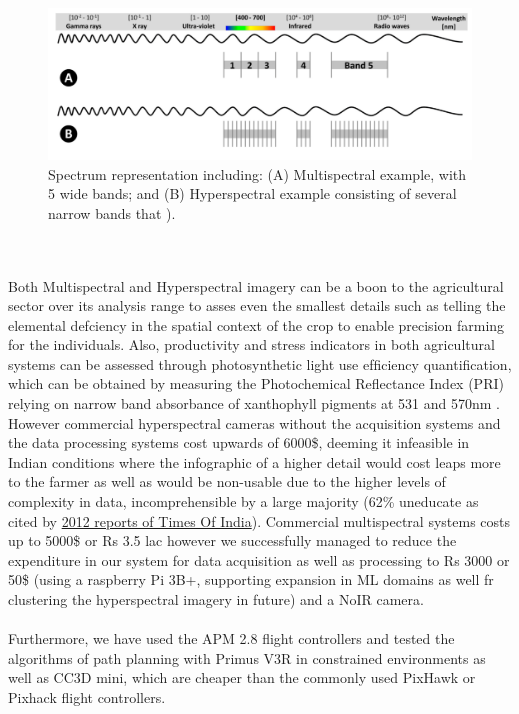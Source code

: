 \begin{figure}[H]
    \centering
    \includegraphics[width=0.7\linewidth]{SummerInterReport/project/Images-Major/em_spectra.png}
    \caption{Spectrum representation including: (A) Multispectral example, with 5 wide bands; and (B) Hyperspectral example consisting of several narrow bands that \cite{fourteen-remotev2}).}
    \label{fig:Concise Flow}
\end{figure}

\\
\\

Both Multispectral and Hyperspectral imagery can be a boon to the agricultural sector over its analysis range to asses even the smallest details such as telling the elemental defciency in the spatial context of the crop to enable precision farming for the individuals. Also, productivity and stress indicators in both agricultural systems can be assessed through photosynthetic light use efﬁciency quantiﬁcation, which can be obtained by measuring the Photochemical Reﬂectance Index (PRI) relying on narrow band absorbance of xanthophyll pigments at 531 and 570nm \cite{fifteen-remotev2}.  However commercial hyperspectral cameras without the acquisition systems and the data processing systems cost upwards of 6000\$, deeming it infeasible in Indian conditions where the infographic of a higher detail would cost leaps more to the farmer as well as would be non-usable due to the higher levels of complexity in data, incomprehensible by a large majority (62\% uneducate as cited by \href{https://timesofindia.indiatimes.com/india/62-farmers-cannot-meet-educational-needs-Survey/articleshow/12049496.cms}{2012 reports of Times Of India}). Commercial multispectral systems costs up to 5000\$ or Rs 3.5 lac however we successfully managed to reduce the expenditure in our system for data acquisition as well as processing to Rs 3000 or 50\$ (using a raspberry Pi 3B+, supporting expansion in ML domains as well fr clustering the hyperspectral imagery in future) and a NoIR camera.
\\
\\
Furthermore, we have used the APM 2.8 flight controllers and tested the algorithms of path planning with Primus V3R in constrained environments as well as CC3D mini, which are cheaper than the commonly used PixHawk or Pixhack flight controllers.



